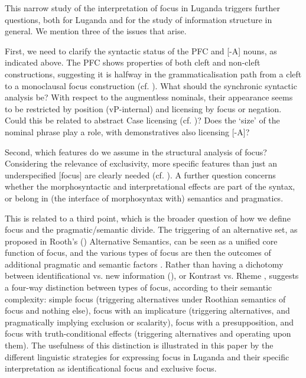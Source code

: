\documentclass[output=paper]{langsci/langscibook}
\begin{document}
This narrow study of the interpretation of focus in Luganda triggers further questions, both for Luganda and for the study of information structure in general. We mention three of the issues that arise.

First, we need to clarify the syntactic status of the PFC and [-A] nouns, as indicated above. The PFC shows properties of both cleft and non-cleft constructions, suggesting it is halfway in the grammaticalisation path from a cleft to a monoclausal focus construction (cf. \citealt{HeineReh1983,HarrisCampbell1995,VanderWalManiacky2015}). What should the synchronic syntactic analysis be? With respect to the augmentless nominals, their appearance seems to be restricted by position (vP-internal) and licensing by focus or negation. Could this be related to abstract Case licensing (cf. \citealt{Halpert2012,Halpert2013,CarstensMletshe2013,CarstensMletshe2015})? Does the ‘size’ of the nominal phrase play a role, with demonstratives also licensing [-A]?

Second, which features do we assume in the structural analysis of focus? Considering the relevance of exclusivity, more specific features than just an underspecified [focus] are clearly needed (cf. \citealt{NeelemanEtAl2009}). A further question concerns whether the morphosyntactic and interpretational effects are part of the syntax, or belong in (the interface of morphosyntax with) semantics and pragmatics.

This is related to a third point, which is the broader question of how we define focus and the pragmatic/semantic divide. The triggering of an alternative set, as proposed in Rooth’s (\citeyear*{Rooth1985,Rooth1992,Rooth1996}) Alternative Semantics, can be seen as a unified core function of focus, and the various types of focus are then the outcomes of additional pragmatic and semantic factors \citep{ZimmermannOnea2011}. Rather than having a dichotomy between identificational vs. new information (\citealt{Kiss1998}), or Kontrast vs. Rheme \citep{VallduviVilkuna1998}, \citet{Bazalgette2015} suggests a four-way distinction between types of focus, according to their semantic complexity: simple focus (triggering alternatives under Roothian semantics of focus and nothing else), focus with an implicature (triggering alternatives, and pragmatically implying exclusion or scalarity), focus with a presupposition, and focus with truth-conditional effects (triggering alternatives and operating upon them). The usefulness of this distinction is illustrated in this paper by the different linguistic strategies for expressing focus in Luganda and their specific interpretation as identificational focus and exclusive focus.
\end{document}
